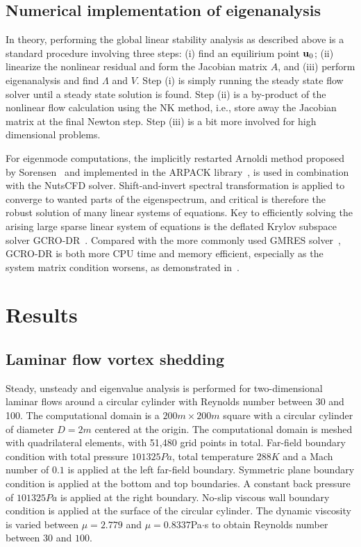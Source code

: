\documentclass[journal,final]{new-aiaa}
\begin{document}
\subsection{Numerical implementation of eigenanalysis}
In theory, performing the global linear stability analysis as described above
is a standard procedure involving three steps: (i) find an equilirium point $\mathbf{u}_0$;
(ii) linearize the nonlinear residual and form the Jacobian matrix $A$, and
(iii) perform eigenanalysis and find $\Lambda$ and $V$. Step (i) is simply
running the steady state flow solver until a steady state solution
is found. Step (ii) is a by-product of the nonlinear flow calculation using
the NK method, i.e., store away the Jacobian matrix at the final Newton step.
Step (iii) is a bit more involved for high dimensional problems.

For eigenmode computations, the implicitly restarted Arnoldi method proposed
by Sorensen~\cite{sorensen1992implicit} and implemented in the ARPACK
library~\cite{lehoucq1998arpack}, is used
in combination with the NutsCFD solver.
Shift-and-invert spectral transformation is applied to converge to wanted parts
of the eigenspectrum, and critical is therefore the robust solution of many linear
systems of equations. 
Key to efficiently solving the arising large sparse linear system of equations
is the deflated Krylov subspace solver GCRO-DR~\cite{parks2006recycling}.
Compared with the more commonly used GMRES solver~\cite{saad1986gmres},
GCRO-DR is both more CPU time and memory efficient, especially as the system
matrix condition worsens, as demonstrated in~\cite{xu2016enabling,xu2017robust}.

\section{Results}
\label{label:results}

\subsection{Laminar flow vortex shedding}
Steady, unsteady and eigenvalue analysis is performed for two-dimensional
laminar flows around a circular cylinder with Reynolds number between 30
and 100. The computational domain is a $200 m \times 200 m$ square with a
circular cylinder of diameter $D=2m$ centered at the origin.
The computational domain is meshed with quadrilateral elements,
with 51,480 grid points in total. Far-field boundary condition
with total pressure $101325 Pa$, total temperature $288 K$ and
a Mach number of $0.1$ is applied at the left far-field boundary.
Symmetric plane boundary condition is applied at the bottom and
top boundaries. A constant back pressure of $101325 Pa$ is
applied at the right boundary. No-slip viscous wall boundary
condition is applied at the surface of the circular cylinder.
The dynamic viscosity is varied between $\mu=2.779$ and
$\mu=0.8337$Pa$\cdot$s to obtain Reynolds number between
$30$ and $100$.
\end{document}
